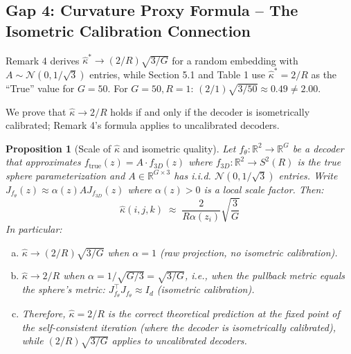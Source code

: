 \documentclass[11pt]{article}
\newtheorem{proposition}{Proposition}
\newcommand{\R}{\mathbb{R}}
\begin{document}
\subsection{Gap 4: Curvature Proxy Formula -- The Isometric Calibration Connection}
\label{sec:curv_formula}

\begin{gapbox}
Remark 4 derives $\hat{\kappa}^* \to (2/R)\sqrt{3/G}$ for a random embedding
with $A \sim \mathcal{N}(0, 1/\sqrt{3})$ entries, while Section 5.1 and
Table 1 use $\hat{\kappa}^* = 2/R$ as the ``True'' value for $G = 50$.
For $G = 50, R = 1$: $(2/1)\sqrt{3/50} \approx 0.49 \ne 2.00$.
\end{gapbox}

\begin{bridgebox}
We prove that $\hat{\kappa} \to 2/R$ holds if and only if the decoder is
isometrically calibrated; Remark 4's formula applies to uncalibrated decoders.

\begin{proposition}[Scale of $\hat\kappa$ and isometric quality]\label{prop:kappa_scale}
Let $f_\theta: \R^2 \to \R^G$ be a decoder that approximates $f_{\mathrm{true}}(z)
= A \cdot f_{3D}(z)$ where $f_{3D}: \R^2 \to S^2(R)$ is the true sphere
parameterization and $A \in \R^{G\times 3}$ has i.i.d. $\mathcal{N}(0,1/\sqrt{3})$
entries. Write $J_{f_\theta}(z) \approx \alpha(z) A J_{f_{3D}}(z)$ where
$\alpha(z) > 0$ is a local scale factor. Then:
\[
    \hat{\kappa}(i,j,k) \;\approx\; \frac{2}{R\alpha(z_i)} \sqrt{\frac{3}{G}}
\]
In particular:
\begin{enumerate}[(a)]
    \item $\hat{\kappa} \to (2/R)\sqrt{3/G}$ when $\alpha = 1$ (raw projection,
    no isometric calibration).
    \item $\hat{\kappa} \to 2/R$ when $\alpha = 1/\sqrt{G/3} = \sqrt{3/G}$,
    i.e., when the pullback metric equals the sphere's metric:
    $J_{f_\theta}^\top J_{f_\theta} \approx I_d$ (isometric calibration).
    \item Therefore, $\hat{\kappa} = 2/R$ is the correct theoretical prediction
    \emph{at the fixed point of the self-consistent iteration} (where the decoder
    is isometrically calibrated), while $(2/R)\sqrt{3/G}$ applies to
    uncalibrated decoders.
\end{enumerate}
\end{proposition}


\end{bridgebox}
\end{document}
